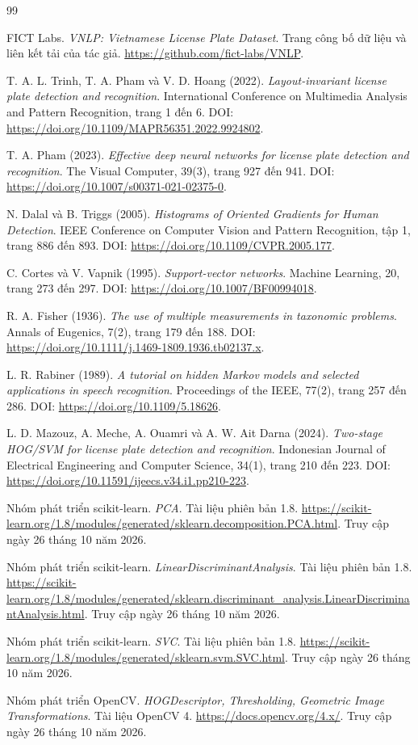 \begin{thebibliography}{99}
FICT Labs. \textit{VNLP: Vietnamese License Plate Dataset}. Trang công bố dữ liệu và liên kết tải của tác giả. \url{https://github.com/fict-labs/VNLP}.

T. A. L. Trinh, T. A. Pham và V. D. Hoang (2022). \textit{Layout-invariant license plate detection and recognition}. International Conference on Multimedia Analysis and Pattern Recognition, trang 1 đến 6. DOI: \url{https://doi.org/10.1109/MAPR56351.2022.9924802}.

T. A. Pham (2023). \textit{Effective deep neural networks for license plate detection and recognition}. The Visual Computer, 39(3), trang 927 đến 941. DOI: \url{https://doi.org/10.1007/s00371-021-02375-0}.

N. Dalal và B. Triggs (2005). \textit{Histograms of Oriented Gradients for Human Detection}. IEEE Conference on Computer Vision and Pattern Recognition, tập 1, trang 886 đến 893. DOI: \url{https://doi.org/10.1109/CVPR.2005.177}.

C. Cortes và V. Vapnik (1995). \textit{Support-vector networks}. Machine Learning, 20, trang 273 đến 297. DOI: \url{https://doi.org/10.1007/BF00994018}.

R. A. Fisher (1936). \textit{The use of multiple measurements in taxonomic problems}. Annals of Eugenics, 7(2), trang 179 đến 188. DOI: \url{https://doi.org/10.1111/j.1469-1809.1936.tb02137.x}.

L. R. Rabiner (1989). \textit{A tutorial on hidden Markov models and selected applications in speech recognition}. Proceedings of the IEEE, 77(2), trang 257 đến 286. DOI: \url{https://doi.org/10.1109/5.18626}.

L. D. Mazouz, A. Meche, A. Ouamri và A. W. Ait Darna (2024). \textit{Two-stage HOG/SVM for license plate detection and recognition}. Indonesian Journal of Electrical Engineering and Computer Science, 34(1), trang 210 đến 223. DOI: \url{https://doi.org/10.11591/ijeecs.v34.i1.pp210-223}.

Nhóm phát triển scikit-learn. \textit{PCA}. Tài liệu phiên bản 1.8. \url{https://scikit-learn.org/1.8/modules/generated/sklearn.decomposition.PCA.html}. Truy cập ngày 26 tháng 10 năm 2026.

Nhóm phát triển scikit-learn. \textit{LinearDiscriminantAnalysis}. Tài liệu phiên bản 1.8. \url{https://scikit-learn.org/1.8/modules/generated/sklearn.discriminant_analysis.LinearDiscriminantAnalysis.html}. Truy cập ngày 26 tháng 10 năm 2026.

Nhóm phát triển scikit-learn. \textit{SVC}. Tài liệu phiên bản 1.8. \url{https://scikit-learn.org/1.8/modules/generated/sklearn.svm.SVC.html}. Truy cập ngày 26 tháng 10 năm 2026.

Nhóm phát triển OpenCV. \textit{HOGDescriptor, Thresholding, Geometric Image Transformations}. Tài liệu OpenCV 4. \url{https://docs.opencv.org/4.x/}. Truy cập ngày 26 tháng 10 năm 2026.
\end{thebibliography}
